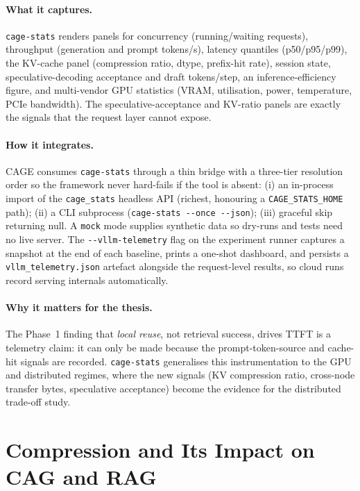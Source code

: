 \documentclass[12pt,a4paper]{article}
\begin{document}
\paragraph{What it captures.} \texttt{cage-stats} renders panels for concurrency
(running/waiting requests), throughput (generation and prompt tokens/s), latency
quantiles (p50/p95/p99), the KV-cache panel (compression ratio, dtype,
prefix-hit rate), session state, speculative-decoding acceptance and draft
tokens/step, an inference-efficiency figure, and multi-vendor GPU statistics (VRAM,
utilisation, power, temperature, PCIe bandwidth). The speculative-acceptance and
KV-ratio panels are exactly the signals that the request layer cannot expose.

\paragraph{How it integrates.} CAGE consumes \texttt{cage-stats} through a thin
bridge with a three-tier resolution order so the framework never hard-fails if the
tool is absent: (i) an in-process import of the \texttt{cage\_stats} headless API
(richest, honouring a \texttt{CAGE\_STATS\_HOME} path); (ii) a CLI subprocess
(\texttt{cage-stats -{}-once -{}-json}); (iii) graceful skip returning null. A
\texttt{mock} mode supplies synthetic data so dry-runs and tests need no live
server. The \texttt{-{}-vllm-telemetry} flag on the experiment runner captures a
snapshot at the end of each baseline, prints a one-shot dashboard, and persists a
\texttt{vllm\_telemetry.json} artefact alongside the request-level results, so cloud
runs record serving internals automatically.

\paragraph{Why it matters for the thesis.} The Phase~1 finding that \emph{local
reuse}, not retrieval success, drives TTFT is a telemetry claim: it can only be
made because the prompt-token-source and cache-hit signals are recorded.
\texttt{cage-stats} generalises this instrumentation to the GPU and distributed
regimes, where the new signals (KV compression ratio, cross-node transfer bytes,
speculative acceptance) become the evidence for the distributed trade-off study.

\section{Compression and Its Impact on CAG and RAG}
\label{sec:compression}
\end{document}
